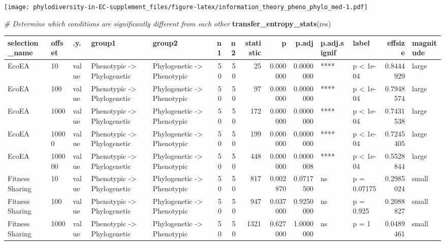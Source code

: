 \documentclass[]{book}
\newenvironment{Shaded}{\begin{snugshade}}{\end{snugshade}}
\newcommand{\CommentTok}[1]{\textcolor[rgb]{0.56,0.35,0.01}{\textit{#1}}}
\newcommand{\KeywordTok}[1]{\textcolor[rgb]{0.13,0.29,0.53}{\textbf{#1}}}
\newcommand{\NormalTok}[1]{#1}
\begin{document}
\texttt{[image: phylodiversity-in-EC-supplement\_files/figure-latex/information\_theory\_pheno\_phylo\_med-1.pdf]}

\begin{Shaded}
\begin{Highlighting}[]
\CommentTok{# Determine which conditions are significantly different from each other}
\KeywordTok{transfer_entropy_stats}\NormalTok{(res)}
\end{Highlighting}
\end{Shaded}

\begin{table}
\centering
\begin{tabular}[t]{l|l|l|l|l|r|r|r|r|r|l|l|r|l}
\hline
selection\_name & offset & .y. & group1 & group2 & n1 & n2 & statistic & p & p.adj & p.adj.signif & label & effsize & magnitude\\
\hline
EcoEA & 10 & value & Phenotypic
    ->
Phylogenetic & Phylogenetic
    ->
Phenotypic & 50 & 50 & 25 & 0.000000 & 0.0000000 & **** & p < 1e-04 & 0.8444929 & large\\
\hline
EcoEA & 100 & value & Phenotypic
    ->
Phylogenetic & Phylogenetic
    ->
Phenotypic & 50 & 50 & 97 & 0.000000 & 0.0000000 & **** & p < 1e-04 & 0.7948574 & large\\
\hline
EcoEA & 1000 & value & Phenotypic
    ->
Phylogenetic & Phylogenetic
    ->
Phenotypic & 50 & 50 & 172 & 0.000000 & 0.0000000 & **** & p < 1e-04 & 0.7431538 & large\\
\hline
EcoEA & 10000 & value & Phenotypic
    ->
Phylogenetic & Phylogenetic
    ->
Phenotypic & 50 & 50 & 199 & 0.000000 & 0.0000000 & **** & p < 1e-04 & 0.7245405 & large\\
\hline
EcoEA & 100000 & value & Phenotypic
    ->
Phylogenetic & Phylogenetic
    ->
Phenotypic & 50 & 50 & 448 & 0.000000 & 0.0000008 & **** & p < 1e-04 & 0.5528844 & large\\
\hline
Fitness Sharing & 10 & value & Phenotypic
    ->
Phylogenetic & Phylogenetic
    ->
Phenotypic & 50 & 50 & 817 & 0.002870 & 0.0717500 & ns & p = 0.07175 & 0.2985024 & small\\
\hline
Fitness Sharing & 100 & value & Phenotypic
    ->
Phylogenetic & Phylogenetic
    ->
Phenotypic & 50 & 50 & 947 & 0.037000 & 0.9250000 & ns & p = 0.925 & 0.2088827 & small\\
\hline
Fitness Sharing & 1000 & value & Phenotypic
    ->
Phylogenetic & Phylogenetic
    ->
Phenotypic & 50 & 50 & 1321 & 0.627000 & 1.0000000 & ns & p = 1 & 0.0489461 & small\\

\end{tabular}
\end{table}
\end{document}
